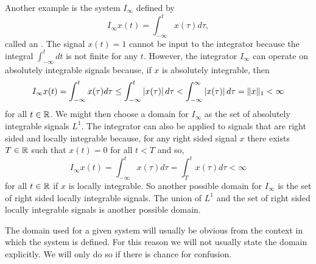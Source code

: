 Another example is the system $I_\infty$ defined by
\begin{equation}\label{eq:deifferentiator}
I_{\infty}x(t) = \int_{-\infty}^{t} x(\tau) d\tau ,
\end{equation}
called an .  %
The signal $x(t) = 1$ cannot be input to the integrator because the integral $\int_{-\infty}^{t} dt$ is not finite for any $t$.  However, the integrator $I_\infty$ can operate on absolutely integrable signals because, if $x$ is absolutely integrable, then 
\[
I_\infty x(t) = \int_{-\infty}^{t} x(\tau) d\tau \leq \int_{-\infty}^{t} \left\vert x(\tau) \right\vert d\tau <  \int_{-\infty}^{\infty} \left\vert x(\tau) \right\vert d\tau = \|x\|_1 < \infty
\] 
for all $t \in {\mathbb R}$.  We might then choose a domain for $I_\infty$ as the set of absolutely integrable signals $L^1$.  The integrator can also be applied to signals that are right sided and locally integrable because, for any right sided signal $x$ there exists $T \in {\mathbb R}$ such that $x(t) = 0$ for all $t < T$ and so,
\[
I_\infty x(t) = \int_{-\infty}^{t} x(\tau) d\tau = \int_{T}^{t} x(\tau) d\tau < \infty
\]
for all $t \in {\mathbb R}$ if $x$ is locally integrable.  So another possible domain for $I_\infty$ is the set of right sided locally integrable signals.  The union of $L^1$ and the set of right sided locally integrable signals is another possible domain.

The domain used for a given system will usually be obvious from the context in which the system is defined.  For this reason we will not usually state the domain explicitly.  We will only do so if there is chance for confusion.  %

